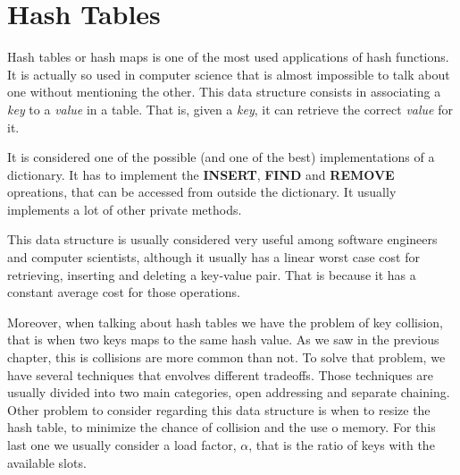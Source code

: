 \chapter{Hash Tables}
\label{cap:Hash Tables}



Hash tables or hash maps is one of the most used applications of hash functions. It is actually so used in computer science that is almost impossible to talk about one without mentioning the other. This data structure consists in associating a \textit{key} to a \textit{value} in a table. That is, given a \textit{key}, it can retrieve the correct \textit{value} for it.

It is considered one of the possible (and one of the best) implementations of a dictionary. It has to implement the \textbf{INSERT}, \textbf{FIND} and \textbf{REMOVE} opreations, that can be accessed from outside the dictionary. It usually implements a lot of other private methods. 

This data structure is usually considered very useful among software engineers and computer scientists, although it usually has a linear worst case cost for retrieving, inserting and deleting a key-value pair. That is because it has a constant average cost for those operations.

Moreover, when talking about hash tables we have the problem of key collision, that is when two keys maps to the same hash value. As we saw in the previous chapter, this is collisions are more common than not. To solve that problem, we have several techniques that envolves different tradeoffs. Those techniques are usually divided into two main categories, open addressing and separate chaining. Other problem to consider regarding this data structure is when to resize the hash table, to minimize the chance of collision and the use o memory. For this last one we usually consider a load factor, \( \alpha \), that is the ratio of keys with the available slots.

